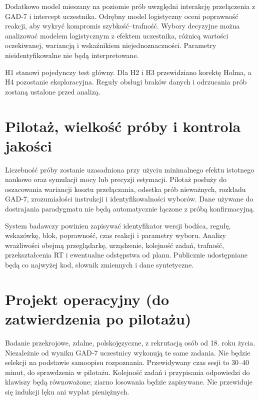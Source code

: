 \documentclass[11pt,a4paper]{article}
\begin{document}
Dodatkowo model mieszany na poziomie prób uwzględni interakcję przełączenia z GAD-7 i intercept uczestnika. Odrębny model logistyczny oceni poprawność reakcji, aby wykryć kompromis szybkość--trafność. Wybory decyzyjne można analizować modelem logistycznym z efektem uczestnika, różnicą wartości oczekiwanej, wariancją i wskaźnikiem niejednoznaczności. Parametry nieidentyfikowalne nie będą interpretowane.

H1 stanowi pojedynczy test główny. Dla H2 i H3 przewidziano korektę Holma, a H4 pozostanie eksploracyjna. Reguły obsługi braków danych i odrzucania prób zostaną ustalone przed analizą.

\section{Pilotaż, wielkość próby i kontrola jakości}
Liczebność próby zostanie uzasadniona przy użyciu minimalnego efektu istotnego naukowo oraz symulacji mocy lub precyzji estymacji. Pilotaż posłuży do oszacowania wariancji kosztu przełączania, odsetka prób nieważnych, rozkładu GAD-7, zrozumiałości instrukcji i identyfikowalności wyborów. Dane używane do dostrajania paradygmatu nie będą automatycznie łączone z próbą konfirmacyjną.

System badawczy powinien zapisywać identyfikator wersji bodźca, regułę, wskazówkę, blok, poprawność, czas reakcji i parametry wyboru. Analizy wrażliwości obejmą przeglądarkę, urządzenie, kolejność zadań, trafność, przekształcenia RT i ewentualne odstępstwa od planu. Publicznie udostępniane będą co najwyżej kod, słownik zmiennych i dane syntetyczne.


\section{Projekt operacyjny (do zatwierdzenia po pilotażu)}
Badanie przekrojowe, zdalne, polskojęzyczne, z rekrutacją osób od 18. roku życia. Niezależnie od wyniku GAD-7 uczestnicy wykonują te same zadania. Nie będzie selekcji na podstawie samoopisu rozpoznania. Przewidywany czas sesji to 30--40 minut, do sprawdzenia w pilotażu. Kolejność zadań i przypisania odpowiedzi do klawiszy będą równoważone; ziarno losowania będzie zapisywane. Nie przewiduje się indukcji lęku ani wypłat pieniężnych.
\end{document}
